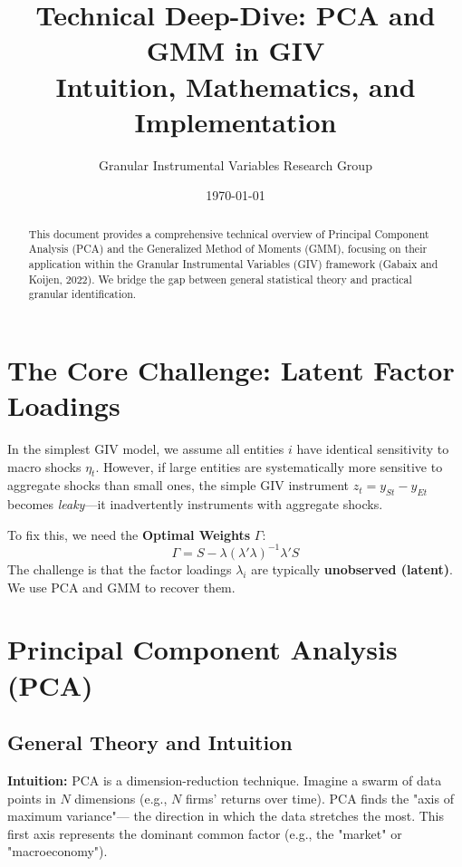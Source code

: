\documentclass[11pt]{article}
\title{\color{DeepNavy}\huge Technical Deep-Dive: PCA and GMM in GIV\\ \large Intuition, Mathematics, and Implementation}
\author{Granular Instrumental Variables Research Group}
\date{\today}
\begin{document}
\maketitle

\begin{abstract}
This document provides a comprehensive technical overview of Principal Component Analysis (PCA) and the Generalized Method of Moments (GMM), focusing on their application within the Granular Instrumental Variables (GIV) framework (Gabaix and Koijen, 2022). We bridge the gap between general statistical theory and practical granular identification.
\end{abstract}

\tableofcontents

\newpage

\section{The Core Challenge: Latent Factor Loadings}
In the simplest GIV model, we assume all entities $i$ have identical sensitivity to macro shocks $\eta_t$. However, if large entities are systematically more sensitive to aggregate shocks than small ones, the simple GIV instrument $z_t = y_{St} - y_{Et}$ becomes \textit{leaky}---it inadvertently instruments with aggregate shocks.

To fix this, we need the \textbf{Optimal Weights} $\Gamma$:
\begin{equation}
    \Gamma = S - \lambda (\lambda' \lambda)^{-1} \lambda' S
\end{equation}
The challenge is that the factor loadings $\lambda_i$ are typically \textbf{unobserved (latent)}. We use PCA and GMM to recover them.

\section{Principal Component Analysis (PCA)}

\subsection{General Theory and Intuition}
\textbf{Intuition:} PCA is a dimension-reduction technique. Imagine a swarm of data points in $N$ dimensions (e.g., $N$ firms' returns over time). PCA finds the "axis of maximum variance"--- the direction in which the data stretches the most. This first axis represents the dominant common factor (e.g., the "market" or "macroeconomy").
\end{document}
